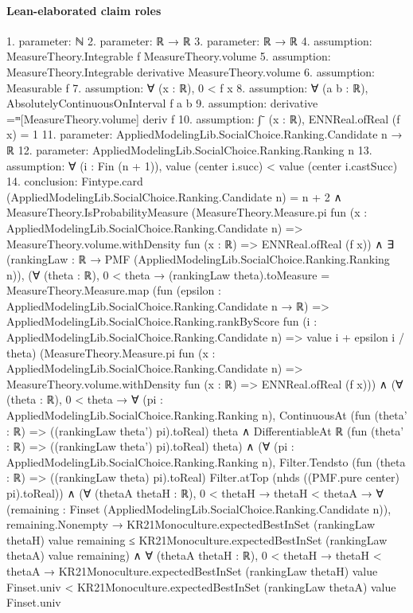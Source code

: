 \documentclass[10pt]{article}
\begin{document}
\paragraph{Lean-elaborated claim roles}\begin{ReviewVerbatim}
1. parameter: ℕ
2. parameter: ℝ → ℝ
3. parameter: ℝ → ℝ
4. assumption: MeasureTheory.Integrable f MeasureTheory.volume
5. assumption: MeasureTheory.Integrable derivative MeasureTheory.volume
6. assumption: Measurable f
7. assumption: ∀ (x : ℝ), 0 < f x
8. assumption: ∀ (a b : ℝ), AbsolutelyContinuousOnInterval f a b
9. assumption: derivative =ᵐ[MeasureTheory.volume] deriv f
10. assumption: ∫⁻ (x : ℝ), ENNReal.ofReal (f x) = 1
11. parameter: AppliedModelingLib.SocialChoice.Ranking.Candidate n → ℝ
12. parameter: AppliedModelingLib.SocialChoice.Ranking.Ranking n
13. assumption: ∀ (i : Fin (n + 1)), value (center i.succ) < value (center i.castSucc)
14. conclusion: Fintype.card (AppliedModelingLib.SocialChoice.Ranking.Candidate n) = n + 2 ∧
  MeasureTheory.IsProbabilityMeasure
      (MeasureTheory.Measure.pi fun (x : AppliedModelingLib.SocialChoice.Ranking.Candidate n) =>
        MeasureTheory.volume.withDensity fun (x : ℝ) => ENNReal.ofReal (f x)) ∧
    ∃ (rankingLaw : ℝ → PMF (AppliedModelingLib.SocialChoice.Ranking.Ranking n)),
      (∀ (theta : ℝ),
          0 < theta →
            (rankingLaw theta).toMeasure =
              MeasureTheory.Measure.map
                (fun (epsilon : AppliedModelingLib.SocialChoice.Ranking.Candidate n → ℝ) =>
                  AppliedModelingLib.SocialChoice.Ranking.rankByScore
                    fun (i : AppliedModelingLib.SocialChoice.Ranking.Candidate n) => value i + epsilon i / theta)
                (MeasureTheory.Measure.pi fun (x : AppliedModelingLib.SocialChoice.Ranking.Candidate n) =>
                  MeasureTheory.volume.withDensity fun (x : ℝ) => ENNReal.ofReal (f x))) ∧
        (∀ (theta : ℝ),
            0 < theta →
              ∀ (pi : AppliedModelingLib.SocialChoice.Ranking.Ranking n),
                ContinuousAt (fun (theta' : ℝ) => ((rankingLaw theta') pi).toReal) theta ∧
                  DifferentiableAt ℝ (fun (theta' : ℝ) => ((rankingLaw theta') pi).toReal) theta) ∧
          (∀ (pi : AppliedModelingLib.SocialChoice.Ranking.Ranking n),
              Filter.Tendsto (fun (theta : ℝ) => ((rankingLaw theta) pi).toReal) Filter.atTop
                (nhds ((PMF.pure center) pi).toReal)) ∧
            (∀ (thetaA thetaH : ℝ),
                0 < thetaH →
                  thetaH < thetaA →
                    ∀ (remaining : Finset (AppliedModelingLib.SocialChoice.Ranking.Candidate n)),
                      remaining.Nonempty →
                        KR21Monoculture.expectedBestInSet (rankingLaw thetaH) value remaining ≤
                          KR21Monoculture.expectedBestInSet (rankingLaw thetaA) value remaining) ∧
              ∀ (thetaA thetaH : ℝ),
                0 < thetaH →
                  thetaH < thetaA →
                    KR21Monoculture.expectedBestInSet (rankingLaw thetaH) value Finset.univ <
                      KR21Monoculture.expectedBestInSet (rankingLaw thetaA) value Finset.univ
\end{ReviewVerbatim}
\end{document}
